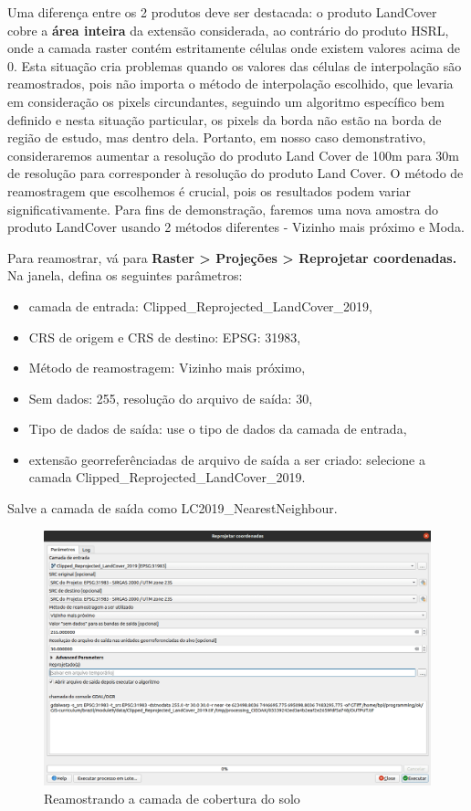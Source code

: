 \documentclass[
]{krantz}
\providecommand{\tightlist}{%
  \setlength{\itemsep}{0pt}\setlength{\parskip}{0pt}}
\begin{document}
Uma diferença entre os 2 produtos deve ser destacada: o produto LandCover cobre a \textbf{área inteira} da extensão considerada, ao contrário do produto HSRL, onde a camada raster contém estritamente células onde existem valores acima de 0. Esta situação cria problemas quando os valores das células de interpolação são reamostrados, pois não importa o método de interpolação escolhido, que levaria em consideração os pixels circundantes, seguindo um algoritmo específico bem definido e nesta situação particular, os pixels da borda não estão na borda de região de estudo, mas dentro dela. Portanto, em nosso caso demonstrativo, consideraremos aumentar a resolução do produto Land Cover de 100m para 30m de resolução para corresponder à resolução do produto Land Cover. O método de reamostragem que escolhemos é crucial, pois os resultados podem variar significativamente. Para fins de demonstração, faremos uma nova amostra do produto LandCover usando 2 métodos diferentes - Vizinho mais próximo e Moda.

Para reamostrar, vá para \textbf{Raster \textgreater{} Projeções \textgreater{} Reprojetar coordenadas.} Na janela, defina os seguintes parâmetros:

\begin{itemize}
\tightlist
\item
  camada de entrada: Clipped\_Reprojected\_LandCover\_2019,
\item
  CRS de origem e CRS de destino: EPSG: 31983,
\item
  Método de reamostragem: Vizinho mais próximo,
\item
  Sem dados: 255, resolução do arquivo de saída: 30,
\item
  Tipo de dados de saída: use o tipo de dados da camada de entrada,
\item
  extensão georreferênciadas de arquivo de saída a ser criado: selecione a camada Clipped\_Reprojected\_LandCover\_2019.
\end{itemize}

Salve a camada de saída como LC2019\_NearestNeighbour.

\begin{figure}
\centering
\includegraphics{media/modulo9/fig945.png}
\caption{Reamostrando a camada de cobertura do solo}
\end{figure}
\end{document}
